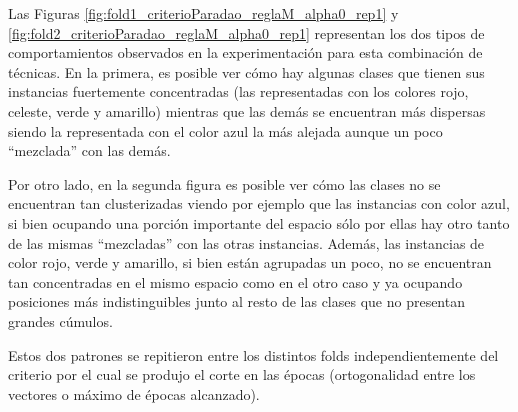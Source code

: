 \documentclass[informe.tex]{subfiles}
\begin{document}
	Las Figuras \ref{fig:fold1_criterioParadao_reglaM_alpha0_rep1} y \ref{fig:fold2_criterioParadao_reglaM_alpha0_rep1} representan los dos tipos de comportamientos observados en la experimentación para esta combinación de técnicas. En la primera, es posible ver cómo hay algunas clases que tienen sus instancias fuertemente concentradas (las representadas con los colores rojo, celeste, verde y amarillo) mientras que las demás se encuentran más dispersas siendo la representada con el color azul la más alejada aunque un poco ``mezclada'' con las demás.
	
	Por otro lado, en la segunda figura es posible ver cómo las clases no se encuentran tan clusterizadas viendo por ejemplo que las instancias con color azul, si bien ocupando una porción importante del espacio sólo por ellas hay otro tanto de las mismas ``mezcladas'' con las otras instancias. Además, las instancias de color rojo, verde y amarillo, si bien están agrupadas un poco, no se encuentran tan concentradas en el mismo espacio como en el otro caso y ya ocupando posiciones más indistinguibles junto al resto de las clases que no presentan grandes cúmulos.
	
	Estos dos patrones se repitieron entre los distintos folds independientemente del criterio por el cual se produjo el corte en las épocas (ortogonalidad entre los vectores o máximo de épocas alcanzado).
	
\end{document}
